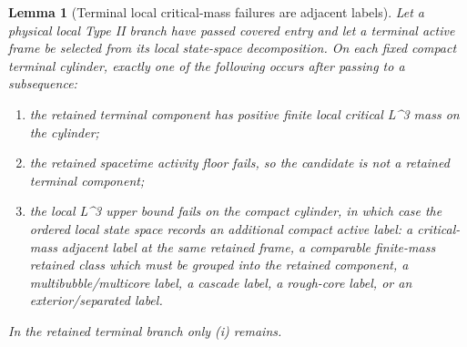 \documentclass[11pt]{amsart}
\def\({}%
\def\){}%
\theoremstyle{plain}
\newtheorem{lemma}[lemma]{Lemma}
\theoremstyle{definition}
\theoremstyle{remark}
\begin{document}
\begin{lemma}[Terminal local critical-mass failures are adjacent labels]
\label{paper6a:lem:terminal-local-critical-mass-routing}
Let a physical local Type II branch have passed covered entry and let a
terminal active frame be selected from its local state-space decomposition.  On
each fixed compact terminal cylinder, exactly one of the following occurs after
passing to a subsequence:
\begin{enumerate}[label=\textup{(\roman*)}]
\item the retained terminal component has positive finite local critical
  \(L^3\) mass on the cylinder;
\item the retained spacetime activity floor fails, so the candidate is not a retained
  terminal component;
\item the local \(L^3\) upper bound fails on the compact cylinder, in which
  case the ordered local state space records an additional compact active
  label: a critical-mass adjacent label at the same retained frame, a
  comparable finite-mass retained class which must be grouped into the retained
  component, a multibubble/multicore label, a cascade label, a rough-core label,
  or an exterior/separated label.
\end{enumerate}
In the retained terminal branch only \textup{(i)} remains.
\end{lemma}
\end{document}
